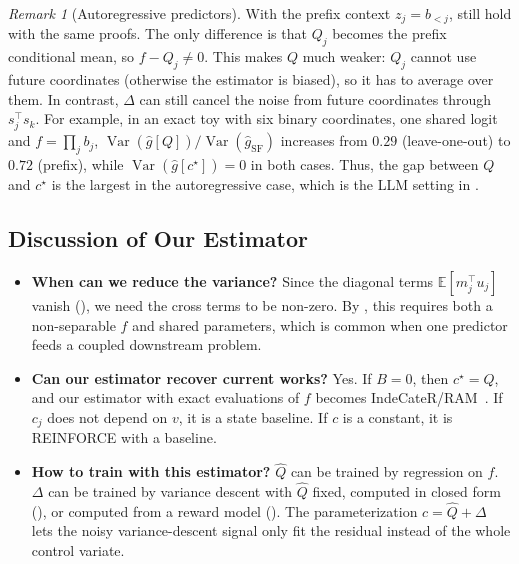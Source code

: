 \documentclass[10pt]{article}
\providecommand{\E}{\mathbb{E}}
\providecommand{\Var}{\operatorname{Var}}
\theoremstyle{plain}
\theoremstyle{definition}
\theoremstyle{remark}
\newtheorem{remark}[theorem]{Remark}
\theoremstyle{definition}
\newcommand{\ctx}[1]{z_{#1}}                 %
\newcommand{\score}[1]{s_{#1}}               %
\newcommand{\ghat}[1]{\hat g[#1]}            %
\newcommand{\rf}{\hat g_{\mathrm{SF}}}       %
\newcommand{\cstar}{c^{\star}}
\begin{document}
\begin{remark}[Autoregressive predictors]\label{rem:ar}
    With the prefix context $\ctx{j}=b_{<j}$,  still hold with the same proofs. The only difference is that $Q_j$ becomes the prefix conditional mean, so $f-Q_j\neq0$. This makes $Q$ much weaker: $Q_j$ cannot use future coordinates (otherwise the estimator is biased), so it has to average over them. In contrast, $\Delta$ can still cancel the noise from future coordinates through $\score{j}^{\top}\score{k}$. For example, in an exact toy with six binary coordinates, one shared logit and $f=\prod_j b_j$, $\Var(\ghat{Q})/\Var(\rf)$ increases from $0.29$ (leave-one-out) to $0.72$ (prefix), while $\Var(\ghat{\cstar})=0$ in both cases. Thus, the gap between $Q$ and $\cstar$ is the largest in the autoregressive case, which is the LLM setting in .
\end{remark}

\subsection{Discussion of Our Estimator}\label{sec:discussion}
\begin{itemize}
    \item \textbf{When can we reduce the variance?} Since the diagonal terms $\E[m_j^{\top}u_j]$ vanish (), we need the cross terms to be non-zero. By , this requires both a non-separable $f$ and shared parameters, which is common when one predictor feeds a coupled downstream problem.
    \item \textbf{Can our estimator recover current works?} Yes. If $B=0$, then $\cstar=Q$, and our estimator with exact evaluations of $f$ becomes IndeCateR/RAM~\cite{SSM23,tokui2017}. If $c_j$ does not depend on $v$, it is a state baseline. If $c$ is a constant, it is REINFORCE with a baseline.
    \item \textbf{How to train with this estimator?} $\hat Q$ can be trained by regression on $f$. $\Delta$ can be trained by variance descent with $\hat Q$ fixed, computed in closed form (), or computed from a reward model (). The parameterization $c=\hat Q+\Delta$ lets the noisy variance-descent signal only fit the residual instead of the whole control variate.
\end{itemize}
\end{document}
